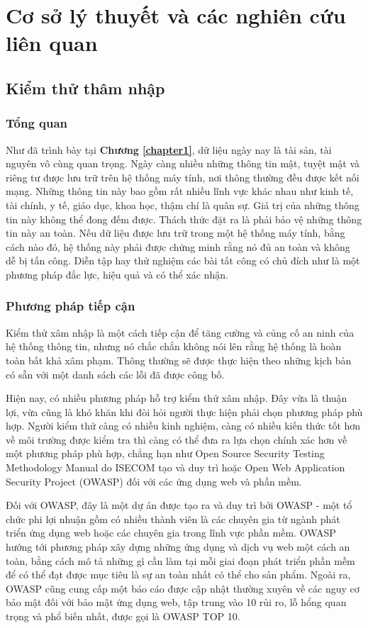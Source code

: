 \chapter{Cơ sở lý thuyết và các nghiên cứu liên quan}
\label{chapter2}
\section{ Kiểm thử thâm nhập}
\subsection{Tổng quan}

Như đã trình bày tại \textbf{Chương \ref{chapter1}}, dữ liệu ngày nay là tài sản, tài nguyên vô cùng quan trọng. Ngày càng nhiều những thông tin mật, tuyệt mật và riêng tư được lưu trữ trên hệ thống máy tính, nơi thông thường đều được kết nối mạng. Những thông tin này bao gồm rất nhiều lĩnh vực khác nhau như kinh tế, tài chính, y tế, giáo dục, khoa học, thậm chí là quân sự. Giá trị của những thông tin này không thể đong đếm được. Thách thức đặt ra là phải bảo vệ những thông tin này an toàn. Nếu dữ liệu được lưu trữ trong một hệ thống máy tính, bằng cách nào đó, hệ thống này phải được chứng minh rằng nó đủ an toàn và không dễ bị tấn công. Diễn tập hay thử nghiệm các bài tất công có chủ đích như là một phương pháp đắc lực, hiệu quả và có thể xác nhận.

\subsection{Phương pháp tiếp cận}

Kiểm thử xâm nhập là một cách tiếp cận để tăng cường và củng cố an ninh của hệ thống thông tin, nhưng nó chắc chắn không nói lên rằng hệ thống là hoàn toàn bất khả xâm phạm. Thông thường sẽ được thực hiện theo những kịch bản có sẵn với một danh sách các lỗi đã được công bố.

Hiện nay, có nhiều phương pháp hỗ trợ kiểm thử xâm nhập. Đây vừa là thuận lợi, vừa cũng là khó khăn khi đòi hỏi người thực hiện phải chọn phương pháp phù hợp. Người kiểm thử càng có nhiều kinh nghiệm, càng có nhiều kiến thức tốt hơn về môi trường được kiểm tra thì càng có thể đưa ra lựa chọn chính xác hơn về một phương pháp phù hợp, chẳng hạn như Open Source Security Testing Methodology Manual do ISECOM tạo và duy trì hoặc Open Web Application Security Project (OWASP) đối với các ứng dụng web và phần mềm. 

Đối với OWASP, đây là một dự án được tạo ra và duy trì bởi OWASP - một tổ chức phi lợi nhuận gồm có nhiều thành viên là các chuyên gia từ ngành phát triển ứng dụng web hoặc các chuyên gia trong lĩnh vực phần mềm. OWASP hướng tới phương pháp xây dựng những ứng dụng và dịch vụ web một cách an toàn, bằng cách mô tả những gì cần làm tại mỗi giai đoạn phát triển phần mềm để có thể đạt được mục tiêu là sự an toàn nhất có thể cho sản phẩm. Ngoài ra, OWASP cũng cung cấp một báo cáo được cập nhật thường xuyên về các nguy cơ bảo mật đối với bảo mật ứng dụng web, tập trung vào 10 rủi ro, lỗ hổng quan trọng và phổ biến nhất, được gọi là OWASP TOP 10.

